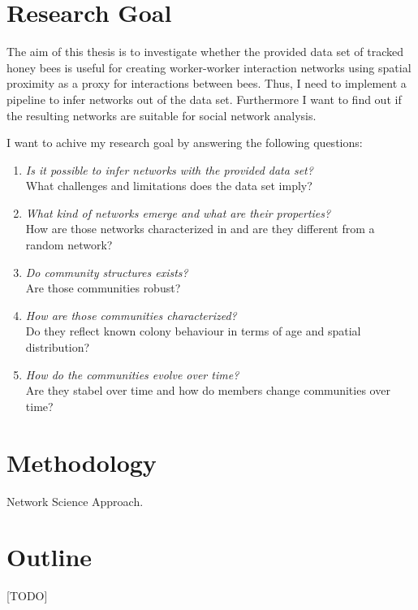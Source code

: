 \section{Research Goal}

The aim of this thesis is to investigate whether the provided data set of tracked honey bees is useful for creating worker-worker interaction networks using spatial proximity as a proxy for interactions between bees. Thus, I need to implement a pipeline to infer networks out of the data set. Furthermore I want to find out if the resulting networks are suitable for social network analysis.

I want to achive my research goal by answering the following questions:

\begin{enumerate}
\item \emph{Is it possible to infer networks with the provided data set?}\\
What challenges and limitations does the data set imply?
\item \emph{What kind of networks emerge and what are their properties?}\\
How are those networks characterized in and are they different from a random network?
\item \emph{Do community structures exists?}\\
Are those communities robust?
\item \emph{How are those communities characterized?}\\
Do they reflect known colony behaviour in terms of age and spatial distribution?
\item \emph{How do the communities evolve over time?}\\
Are they stabel over time and how do members change communities over time?

\end{enumerate}


\section{Methodology}

Network Science Approach.

\section{Outline}
[TODO]